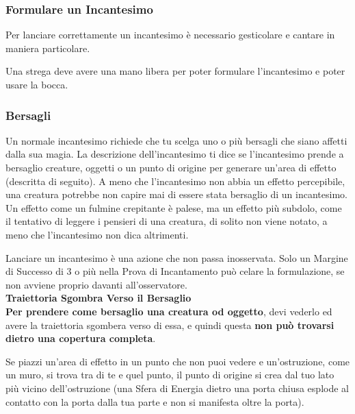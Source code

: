 \documentclass[12pt,a4paper,twoside,openany]{book}
\begin{document}
\begin{multicols}{2}
\begin{itemize}
\end{itemize}

\subsubsection{Formulare un Incantesimo}

Per lanciare correttamente un incantesimo è necessario gesticolare e cantare in maniera particolare.

Una strega deve avere una mano libera per poter formulare l'incantesimo e poter usare la bocca.

\subsubsection{Bersagli}\label{magiebersagli}

Un normale incantesimo richiede che tu scelga uno o più bersagli che siano affetti dalla sua magia. La descrizione dell'incantesimo ti dice se l'incantesimo prende a bersaglio creature, oggetti o un punto di origine per generare un'area di effetto (descritta di seguito). A meno che l'incantesimo non abbia un effetto percepibile, una creatura potrebbe non capire mai di essere stata bersaglio di un incantesimo. Un effetto come un fulmine crepitante è palese, ma un effetto più subdolo, come il tentativo di leggere i pensieri di una creatura, di solito non viene notato, a meno che l'incantesimo non dica altrimenti.

Lanciare un incantesimo è una azione che non passa inosservata. Solo un Margine di Successo di 3 o più nella Prova di Incantamento può celare la formulazione, se non avviene proprio davanti all'osservatore.\\

\textbf{Traiettoria Sgombra Verso il Bersaglio}\\

\textbf{Per prendere come bersaglio una creatura od oggetto}, devi vederlo ed avere la traiettoria sgombera verso di essa, e quindi questa \textbf{non può trovarsi dietro una copertura completa}.

Se piazzi un'area di effetto in un punto che non puoi vedere e un'ostruzione, come un muro, si trova tra di te e quel punto, il punto di origine si crea dal tuo lato più vicino dell'ostruzione (una Sfera di Energia dietro una porta chiusa esplode al contatto con la porta dalla tua parte e non si manifesta oltre la porta).\\


\end{multicols}
\end{document}
